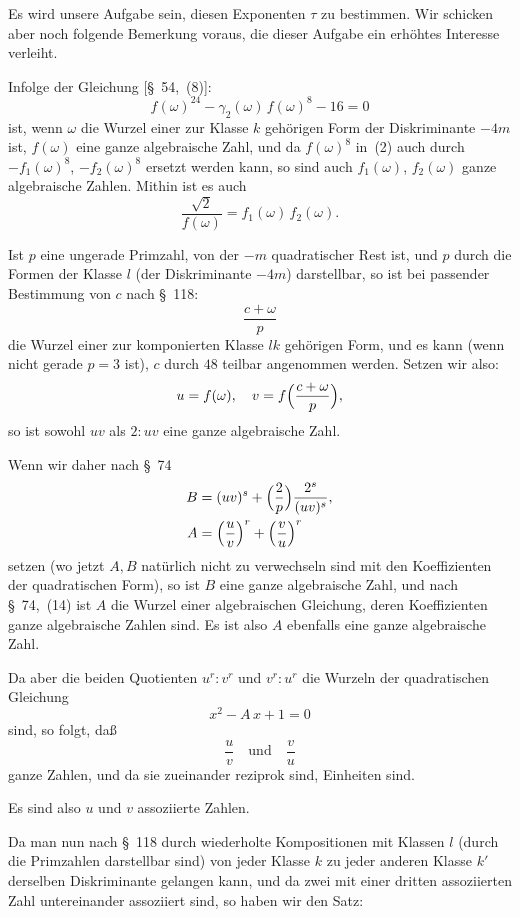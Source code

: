 \documentclass[12pt,a4paper]{article}
\theoremstyle{definition}
\begin{document}
Es wird unsere Aufgabe sein, diesen Exponenten $\tau$ zu bestimmen. Wir 
schicken aber noch folgende Bemerkung voraus, die dieser Aufgabe ein 
erhöhtes Interesse verleiht.

Infolge der Gleichung [\S~54,~(8)]:
\begin{equation}
f(\omega)^{24} - \gamma_{2}(\omega)\,f(\omega)^{8} - 16 = 0
\end{equation}
ist, wenn $\omega$ die Wurzel einer zur Klasse $k$ gehörigen Form der 
Diskriminante $-4m$ ist, $f(\omega)$ eine ganze algebraische Zahl, und da 
$f(\omega)^{8}$ in~(2) auch durch $-f_{1}(\omega)^{8}$, $-f_{2}(\omega)^{8}$ 
ersetzt werden kann, so sind auch $f_{1}(\omega)$, $f_{2}(\omega)$ ganze 
algebraische Zahlen. Mithin ist es auch
\[
\frac{\sqrt{2}}{f(\omega)} = f_{1}(\omega)\,f_{2}(\omega).
\]

Ist $p$ eine ungerade Primzahl, von der $-m$ quadratischer Rest ist, und 
$p$ durch die Formen der Klasse $l$ (der Diskriminante $-4m$) darstellbar, 
so ist bei passender Bestimmung von $c$ nach \S~118:
\[
\frac{c + \omega}{p}
\]
die Wurzel einer zur komponierten Klasse $lk$ gehörigen Form, und es kann 
(wenn nicht gerade $p = 3$ ist), $c$ durch $48$ teilbar angenommen werden. 
Setzen wir also:
\[
u = f(\omega),\quad v = f\Bigl(\frac{c + \omega}{p}\Bigr),
\]
so ist sowohl $uv$ als $2:uv$ eine ganze algebraische Zahl.

Wenn wir daher nach \S~74
\begin{align*}
B &= (uv)^{s} + \Bigl(\frac{2}{p}\Bigr)\frac{2^{s}}{(uv)^{s}},\\
A &= \Bigl(\frac{u}{v}\Bigr)^{r} + \Bigl(\frac{v}{u}\Bigr)^{r}
\end{align*}
setzen (wo jetzt $A, B$ natürlich nicht zu verwechseln sind mit den 
Koeffizienten der quadratischen Form), so ist $B$ eine ganze algebraische 
Zahl, und nach \S~74,~(14) ist $A$ die Wurzel einer algebraischen 
Gleichung, deren Koeffizienten ganze algebraische Zahlen sind. Es ist also 
$A$ ebenfalls eine ganze algebraische Zahl.

Da aber die beiden Quotienten $u^{r}:v^{r}$ und $v^{r}:u^{r}$ die Wurzeln der 
quadratischen Gleichung
\[
x^{2} - A\,x + 1 = 0
\]
sind, so folgt, daß
\[
\frac{u}{v}\quad\text{und}\quad\frac{v}{u}
\]
ganze Zahlen, und da sie zueinander reziprok sind, Einheiten sind.

Es sind also $u$ und $v$ assoziierte Zahlen.

Da man nun nach \S~118 durch wiederholte Kompositionen mit Klassen $l$ 
(durch die Primzahlen darstellbar sind) von jeder Klasse $k$ zu jeder 
anderen Klasse $k'$ derselben Diskriminante gelangen kann, und da zwei mit 
einer dritten assoziierten Zahl untereinander assoziiert sind, so haben wir 
den Satz:
\end{document}
